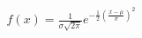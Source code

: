 \documentclass[preview]{standalone}
\begin{document}
\begin{align*}
f(x)=\frac{1} {\sigma  \sqrt{2 \pi}} e^{-\frac{1}{2}\left(\frac{x- \mu } {\sigma }\right)^2}
\end{align*}
\end{document}
